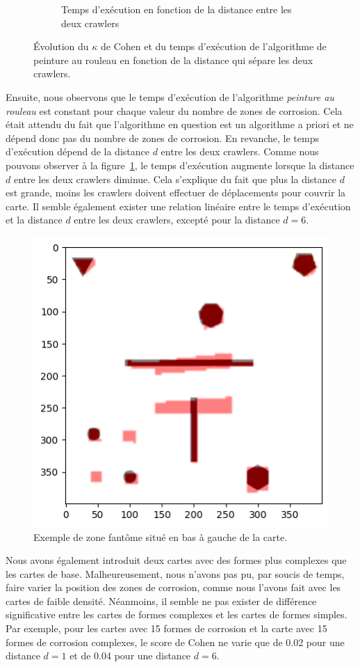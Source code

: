 \documentclass[francais,RandD]{rapportPFE}
\begin{document}
\begin{figure}[h!]
\begin{subfigure}[t]{0.49\linewidth}
						\caption{Temps d'exécution en fonction de la distance entre les deux crawlers}
						\label{fig:peinture_au_rouleau-time_vs_distance}
				\end{subfigure}
				\caption{Évolution du $\kappa$ de Cohen et du temps d'exécution de l'algorithme de peinture au rouleau en fonction de la distance qui sépare les deux crawlers.}
				\label{fig:peinture_au_rouleau-distance}
			\end{figure}

			Ensuite, nous observons que le temps d'exécution de l'algorithme \textit{peinture au rouleau} est constant pour chaque valeur du nombre de zones de corrosion.
			Cela était attendu du fait que l'algorithme en question est un algorithme a priori et ne dépend donc pas du nombre de zones de corrosion.
			En revanche, le temps d'exécution dépend de la distance $d$ entre les deux crawlers.
			Comme nous pouvons observer à la figure~\ref{fig:peinture_au_rouleau-time_vs_distance}, le temps d'exécution augmente lorsque la distance $d$ entre les deux crawlers diminue.
			Cela s'explique du fait que plus la distance $d$ est grande, moins les crawlers doivent effectuer de déplacements pour couvrir la carte.
			Il semble également exister une relation linéaire entre le temps d'exécution et la distance $d$ entre les deux crawlers, excepté pour la distance $d = 6$.

			\begin{figure}[h!]
				\centering
				\includegraphics[width=0.5\linewidth]{graphics/output.png}
				\caption{Exemple de zone fantôme situé en bas à gauche de la carte.}
				\label{fig:ghost_zone}
			\end{figure}

			Nous avons également introduit deux cartes avec des formes plus complexes que les cartes de base.
			Malheureusement, nous n'avons pas pu, par soucis de temps, faire varier la position des zones de corrosion, comme nous l'avons fait avec les cartes de faible densité.
			Néanmoins, il semble ne pas exister de différence significative entre les cartes de formes complexes et les cartes de formes simples.
			Par exemple, pour les cartes avec 15 formes de corrosion et la carte avec 15 formes de corrosion complexes, le score de Cohen ne varie que de 0.02 pour une distance $d = 1$ et de 0.04 pour une distance $d = 6$.
\end{document}
